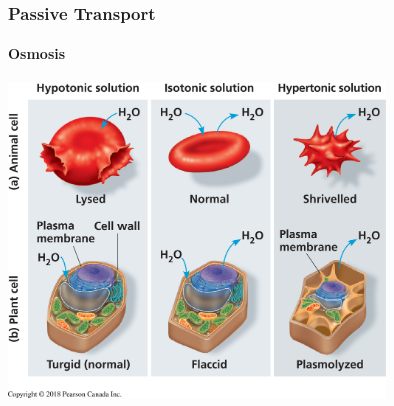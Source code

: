 \documentclass[10pt]{beamer}
\begin{document}
\begin{frame}[t]
\frametitle{Passive Transport}
\framesubtitle{Osmosis}

	\begin{center}
		\includegraphics[width=0.75\textwidth]{figures/fg07_12.jpg}
	\end{center}	
\end{frame}
\end{document}
